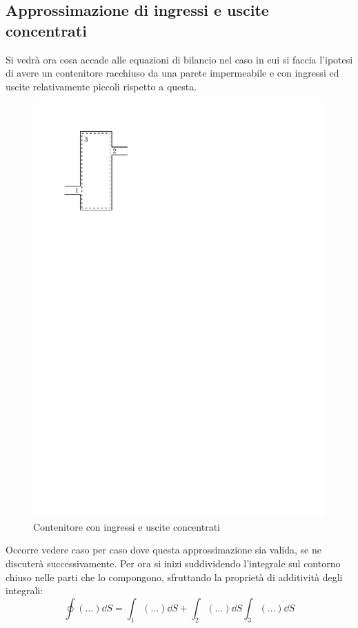 \subsection{Approssimazione di ingressi e uscite concentrati}
Si vedrà ora cosa accade alle equazioni di bilancio nel caso in cui si faccia l'ipotesi di avere un contenitore racchiuso da una parete impermeabile e con ingressi ed uscite relativamente piccoli rispetto a questa.
%
	\begin{figure}[ht]
		\includegraphics[scale=0.9]{./3.2 Ingressi e uscite concentrati/3.2-1}
		\centering
		\caption{Contenitore con ingressi e uscite concentrati}
	\end{figure}
%
Occorre vedere caso per caso dove questa approssimazione sia valida, se ne discuterà successivamente. 
Per ora si inizi suddividendo l'integrale sul contorno chiuso nelle parti che lo compongono, sfruttando la proprietà di additività degli integrali:
%
	\begin{equation*}
		\oint (\ldots) \dd{S} = \int_1 (\ldots) \dd{S} + \int_2 (\ldots) \dd{S} \int_3 (\ldots) \dd{S}
	\end{equation*}
%

